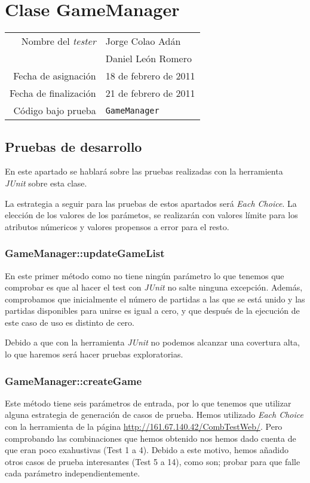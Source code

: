 \section{Clase GameManager}


{\small
\begin{tabular}{r|l}
Nombre del \textit{tester} & Jorge Colao Adán \\
& Daniel León Romero\\
Fecha de asignación & 18 de febrero de 2011 \\
Fecha de finalización & 21 de febrero de 2011 \\
Código bajo prueba & \texttt{GameManager}
\end{tabular}
}

\subsection{Pruebas de desarrollo}

En este apartado se hablará sobre las pruebas realizadas con la herramienta \textit{JUnit} sobre esta clase.

La estrategia a seguir para las pruebas de estos apartados será \textit{Each Choice}. La elección de los valores de los parámetos, se realizarán con valores límite para los atributos númericos y valores propensos a error para el resto.

\subsubsection{GameManager::updateGameList}

En este primer método como no tiene ningún parámetro lo que tenemos que comprobar es que al hacer el test con \textit{JUnit} no salte ninguna excepción. Además, comprobamos que inicialmente el número de partidas a las que se está unido y las partidas disponibles para unirse es igual a cero, y que después de la ejecución de este caso de uso es distinto de cero.

Debido a que con la herramienta \textit{JUnit} no podemos alcanzar una covertura alta, lo que haremos será hacer pruebas exploratorias.

\subsubsection{GameManager::createGame}

Este método tiene seis parámetros de entrada, por lo que tenemos que utilizar alguna estrategia de generación de casos de prueba. Hemos utilizado \textit{Each Choice} con la herramienta de la página \url{http://161.67.140.42/CombTestWeb/}. Pero comprobando las combinaciones que hemos obtenido nos hemos dado cuenta de que eran poco exahustivas (Test 1 a 4). Debido a este motivo, hemos añadido otros casos de prueba interesantes (Test 5 a 14), como son; probar para que falle cada parámetro independientemente.

